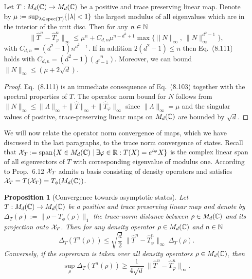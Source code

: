 \documentclass[11pt,a4paper]{article}
\theoremstyle{plain}
\newtheorem{proposition}{Proposition}[section]
\theoremstyle{definition}
\theoremstyle{remark}
\begin{document}
\begin{theorem}
    Let $T:M_d(\mathbb{C})\to M_d(\mathbb{C})$ be a positive and trace preserving linear map. Denote by
    $\mu:=\sup_{\lambda\in\operatorname{spec}(T)}\{|\lambda|<1\}$ the largest modulus of all eigenvalues which are in the interior of the unit disc.
    Then for any $n\in\mathbb{N}$
    \begin{equation}\tag{8.111}
        \|\hat{T}^n-\hat{T}_\varphi^n\|_\infty
        \le \mu^n + C_{d,n}\mu^{n-d^2+1}\max\{\|N\|_\infty,\ \|N\|_\infty^{d^2-1}\},
    \end{equation}
    with $C_{d,n}=(d^2-1)n^{d^2-1}$. If in addition $2(d^2-1)\le n$ then Eq.~(8.111) holds with $C_{d,n}=(d^2-1)\binom{n}{d^2-1}$.
    Moreover, we can bound $\|N\|_\infty \le (\mu+2\sqrt{d})$.
\end{theorem}

\begin{proof}
    Eq.~(8.111) is an immediate consequence of Eq.~(8.103) together with the spectral properties of $T$.
    The operator norm bound for $N$ follows from $\|N\|_\infty\le \|\Lambda\|_\infty+\|\hat{T}\|_\infty+\|\hat{T}_\varphi\|_\infty$ since $\|\Lambda\|_\infty=\mu$
    and the singular values of positive, trace-preserving linear maps on $M_d(\mathbb{C})$ are bounded by $\sqrt{d}$.
\end{proof}

We will now relate the operator norm convergence of maps, which we have discussed in the last paragraphs, to the trace norm convergence of states.
Recall that $\mathcal{X}_T:=\operatorname{span}\{X\in M_d(\mathbb{C})\mid \exists \varphi\in\mathbb{R}: T(X)=e^{i\varphi}X\}$ is the complex linear span of all eigenvectors of $T$ with corresponding eigenvalue of modulus one.
According to Prop.~6.12 $\mathcal{X}_T$ admits a basis consisting of density operators and satisfies $\mathcal{X}_T=T(\mathcal{X}_T)=T_\phi(M_d(\mathbb{C}))$.

\begin{proposition}[Convergence towards asymptotic states]
    Let $T:M_d(\mathbb{C})\to M_d(\mathbb{C})$ be a positive and trace preserving linear map and denote by
    $\Delta_T(\rho):=\|\rho-T_\phi(\rho)\|_1$ the trace-norm distance between $\rho\in M_d(\mathbb{C})$ and its projection onto $\mathcal{X}_T$.
    Then for any density operator $\rho\in M_d(\mathbb{C})$ and $n\in\mathbb{N}$
    \begin{equation}\tag{8.112}
        \Delta_T(T^n(\rho)) \le \sqrt{\frac{d}{2}}\ \|\hat{T}^n-\hat{T}_\varphi^n\|_\infty\ \Delta_T(\rho).
    \end{equation}
    Conversely, if the supremum is taken over all density operators $\rho\in M_d(\mathbb{C})$, then
    \begin{equation}\tag{8.113}
        \sup_\rho \Delta_T(T^n(\rho)) \ge \frac{1}{4\sqrt{d}}\ \|\hat{T}^n-\hat{T}_\varphi^n\|_\infty.
    \end{equation}
\end{proposition}
\end{document}
